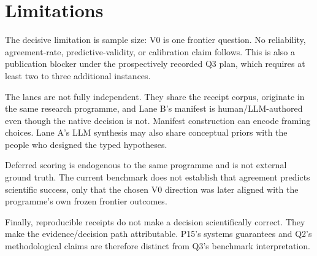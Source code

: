 \section{Limitations}

The decisive limitation is sample size: V0 is one frontier question. No reliability, agreement-rate, predictive-validity, or calibration claim follows. This is also a publication blocker under the prospectively recorded Q3 plan, which requires at least two to three additional instances.

The lanes are not fully independent. They share the receipt corpus, originate in the same research programme, and Lane B's manifest is human/LLM-authored even though the native decision is not. Manifest construction can encode framing choices. Lane A's LLM synthesis may also share conceptual priors with the people who designed the typed hypotheses.

Deferred scoring is endogenous to the same programme and is not external ground truth. The current benchmark does not establish that agreement predicts scientific success, only that the chosen V0 direction was later aligned with the programme's own frozen frontier outcomes.

Finally, reproducible receipts do not make a decision scientifically correct. They make the evidence/decision path attributable. P15's systems guarantees and Q2's methodological claims are therefore distinct from Q3's benchmark interpretation.